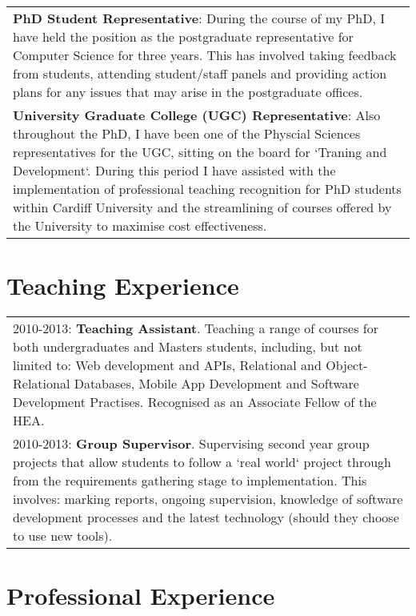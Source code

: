 \documentclass[11pt,fullpage]{article}
\begin{document}
\begin{tabular}{>{\everypar{\hangindent0.5in}}p{6in}}
	\textbf{PhD Student Representative}: During the course of my PhD, I have held the position as the postgraduate representative for Computer Science for three years. This has involved taking feedback from students, attending student/staff panels and providing action plans for any issues that may arise in the postgraduate offices. \\
	\textbf{University Graduate College (UGC) Representative}: Also throughout the PhD, I have been one of the Physcial Sciences representatives for the UGC, sitting on the board for `Traning and Development`. During this period I have assisted with the implementation of professional teaching recognition for PhD students within Cardiff University and the streamlining of courses offered by the University to maximise cost effectiveness. \\
\end{tabular}

\section*{Teaching Experience}

\begin{tabular}{>{\everypar{\hangindent0.5in}}p{6in}}
	2010-2013: \textbf{Teaching Assistant}. Teaching a range of courses for both undergraduates and Masters students, including, but not limited to: Web development and APIs, Relational and Object-Relational Databases, Mobile App Development and Software Development Practises. Recognised as an Associate Fellow of the HEA.\\
	2010-2013: \textbf{Group Supervisor}. Supervising second year group projects that allow students to follow a `real world` project through from the requirements gathering stage to implementation.  This involves: marking reports, ongoing supervision, knowledge of software development processes and the latest technology (should they choose to use new tools).\\
\end{tabular}

\section*{Professional Experience}
\end{document}
